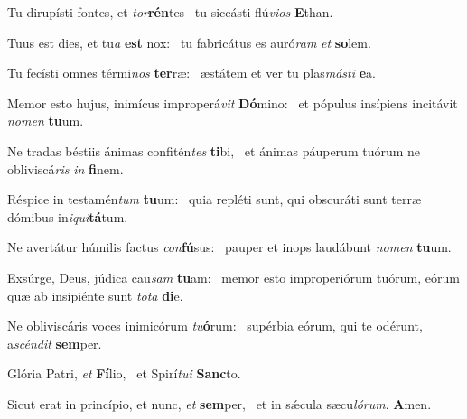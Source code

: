 \item Tu dirupísti fontes, et \textit{tor}\textbf{rén}tes~\psstar{} tu siccásti flú\textit{vi}\textit{os} \textbf{E}than.
\item Tuus est dies, et tu\textit{a} \textbf{est} nox:~\psstar{} tu fabricátus es auró\textit{ram} \textit{et} \textbf{so}lem.
\item Tu fecísti omnes térmi\textit{nos} \textbf{ter}ræ:~\psstar{} æstátem et ver tu plas\textit{más}\textit{ti} \textbf{e}a.
\item Memor esto hujus, inimícus improperá\textit{vit} \textbf{Dó}mino:~\psstar{} et pópulus insípiens incitávit \textit{no}\textit{men} \textbf{tu}um.
\item Ne tradas béstiis ánimas confitén\textit{tes} \textbf{ti}bi,~\psstar{} et ánimas páuperum tuórum ne obliviscá\textit{ris} \textit{in} \textbf{fi}nem.
\item Réspice in testamén\textit{tum} \textbf{tu}um:~\psstar{} quia repléti sunt, qui obscuráti sunt terræ dómibus in\textit{i}\textit{qui}\textbf{tá}tum.
\item Ne avertátur húmilis factus \textit{con}\textbf{fú}sus:~\psstar{} pauper et inops laudábunt \textit{no}\textit{men} \textbf{tu}um.
\item Exsúrge, Deus, júdica cau\textit{sam} \textbf{tu}am:~\psstar{} memor esto improperiórum tuórum, eórum quæ ab insipiénte sunt \textit{to}\textit{ta} \textbf{di}e.
\item Ne obliviscáris voces inimicórum \textit{tu}\textbf{ó}rum:~\psstar{} supérbia eórum, qui te odérunt, a\textit{scén}\textit{dit} \textbf{sem}per.
\item Glória Patri, \textit{et} \textbf{Fí}lio,~\psstar{} et Spirí\textit{tu}\textit{i} \textbf{Sanc}to.
\item Sicut erat in princípio, et nunc, \textit{et} \textbf{sem}per,~\psstar{} et in sǽcula sæcu\textit{ló}\textit{rum}. \textbf{A}men.
